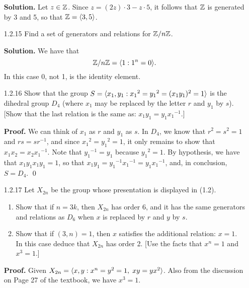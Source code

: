 \begin{enumerate}
      \textbf{Solution.} Let $z \in \mathbb{Z}$. Since $z = (2z) \cdot 3 - z \cdot 5$,
      it follows that $\mathbb{Z}$ is generated by 3 and 5, so that $\mathbb{Z} = \langle 3, 5 \rangle$.
   \item[1.2.15]  Find a set of generators and relations for $\mathbb{Z}/n\mathbb{Z}$.
   
      \textbf{Solution.} We have that
      $$\mathbb{Z}/n\mathbb{Z} = \langle 1 : 1^n = 0 \rangle.$$
      In this case 0, not 1, is the identity element.
   \item[1.2.16]  Show that the group $S =
                  \langle x_1, y_1 : {x_1}^2 = {y_1}^2 = (x_1y_1)^2 = 1 \rangle$ is the
                  dihedral group $D_4$ (where $x_1$ may be replaced by the
                  letter $r$ and $y_1$ by $s$). [Show that the last relation is
                  the same as: $x_1y_1 = y_1{x_1}^{-1}$.]

      \textbf{Proof.} We can think of $x_1$ as $r$ and $y_1$ as $s$. In $D_4$,
      we know that $r^2 = s^2 = 1$ and $rs = sr^{-1}$, and since
      ${x_1}^2 = {y_1}^2 = 1$, it only remains to show that
      $x_1x_2 = x_2{x_1}^{-1}$. Note that ${y_1}^{-1} = y_1$ because
      ${y_1}^2 = 1$. By hypothesis, we have that $x_1y_1x_1y_1 = 1$,
      so that $x_1y_1 = {y_1}^{-1}{x_1}^{-1} = y_1{x_1}^{-1}$, and, in 
      conclusion, $S = D_4$. \qed
   \item[1.2.17]  Let $X_{2n}$ be the group whose presentation
                                  is displayed in (1.2).
                  \begin{enumerate}
                     \item Show that if $n = 3k$, then $X_{2n}$ has order 6, and
                           it has the same generators and relations as $D_6$
                           when $x$ is replaced by $r$ and $y$ by $s$.
                     \item Show that if $(3, n) = 1$, then $x$ satisfies the
                           additional relation: $x = 1$. In this case deduce
                           that $X_{2n}$ has order 2. [Use the facts that
                           $x^n = 1$ and $x^3 = 1$.]
                  \end{enumerate}

      \textbf{Proof.} Given $X_{2n} = \langle x, y :  x^n = y^2 = 1, \;xy = yx^2 \rangle$.
      Also from the discussion on Page 27 of the textbook, we have $x^3 = 1$.


\end{enumerate}
